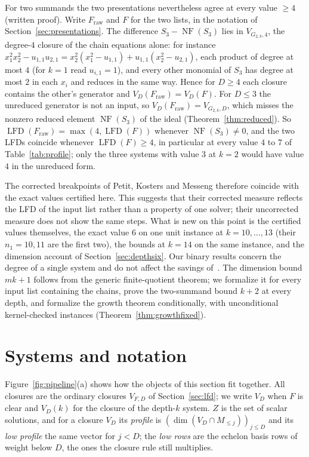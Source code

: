 \documentclass[11pt]{article}
\theoremstyle{definition}\newtheorem{definition}[theorem]{Definition}
\theoremstyle{remark}\newtheorem{remark}[theorem]{Remark}
\newcommand{\lfd}{\operatorname{LFD}}
\newcommand{\NF}{\operatorname{NF}}
\begin{document}
For two summands the two presentations nevertheless agree at every value
$\ge4$ (written proof). Write $F_{\mathrm{raw}}$ and $F$ for the two lists,
in the notation of Section~\ref{sec:presentations}. The difference
$S_3-\NF(S_3)$ lies in $V_{G_{2,k},4}$, the degree-$4$ closure of the chain
equations alone: for instance
$x_1^2x_2^2-u_{1,1}u_{2,1}=x_2^2(x_1^2-u_{1,1})+u_{1,1}(x_2^2-u_{2,1})$,
each product of degree at most $4$ (for $k=1$ read $u_{i,1}=1$), and every
other monomial of $S_3$ has degree at most $2$ in each $x_i$ and reduces in
the same way. Hence for $D\ge4$ each closure contains the other's generator
and $V_D(F_{\mathrm{raw}})=V_D(F)$. For $D\le3$ the unreduced generator is
not an input, so $V_D(F_{\mathrm{raw}})=V_{G_{2,k},D}$, which misses the
nonzero reduced element $\NF(S_3)$ of the ideal (Theorem~\ref{thm:reduced}).
So $\lfd(F_{\mathrm{raw}})=\max(4,\lfd(F))$ whenever $\NF(S_3)\ne0$, and the
two LFDs coincide whenever $\lfd(F)\ge4$, in particular at every value $4$
to $7$ of Table~\ref{tab:profile}; only the three systems with value $3$ at
$k=2$ would have value $4$ in the unreduced form.

The corrected breakpoints of Petit, Kosters and Messeng therefore coincide
with the exact values certified here. This suggests that their corrected
measure reflects the LFD of the input list rather than a property of one
solver; their uncorrected measure does not show the same steps. What is new
on this point is the certified values themselves, the exact value $6$ on one
unit instance at $k=10,\ldots,13$ (their $n_1=10,11$ are the first two), the
bounds at $k=14$ on the same instance, and the dimension account of
Section~\ref{sec:depthsix}. Our binary results concern the degree of a
single system and do not affect the savings of~\cite{ggmp21}. The dimension
bound $mk+1$ follows from the generic finite-quotient theorem; we formalize
it for every input list containing the chains, prove the two-summand bound
$k+2$ at every depth, and formalize the growth theorem conditionally, with
unconditional kernel-checked instances (Theorem~\ref{thm:growthfixed}).

\section{Systems and notation}\label{sec:systems}
Figure~\ref{fig:pipeline}(a) shows how the objects of this section fit
together. All closures are the ordinary closures $V_{F,D}$ of Section~\ref{sec:lfd};
we write $V_D$ when $F$ is clear and $V_D(k)$ for the closure of the
depth-$k$ system. $Z$ is the set of scalar solutions, and for a closure
$V_D$ its \emph{profile} is $(\dim(V_D\cap M_{\le j}))_{j\le D}$ and its
\emph{low profile} the same vector for $j<D$; the
\emph{low rows} are the echelon basis rows of weight below $D$, the ones
the closure rule still multiplies.
\end{document}
